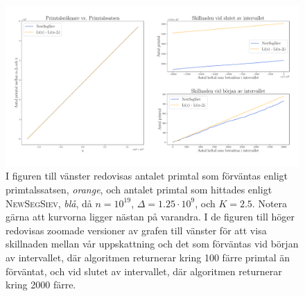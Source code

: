 \begin{figure}[H]
    \centering
    \includegraphics[width = \textwidth]{coen/Images/Primes.pdf}
    \caption{I figuren till vänster redovisas antalet primtal som förväntas enligt primtalssatsen, \textit{orange}, och antalet primtal som hittades enligt \textsc{NewSegSiev}, \textit{blå}, då \(n = 10^{19}\), \(\Delta = 1.25\cdot10^{9}\), och \(K = 2.5\). 
    Notera gärna att kurvorna ligger nästan på varandra. 
    I de figuren till höger redovisas zoomade versioner av grafen till vänster för att visa skillnaden mellan vår uppskattning och det som förväntas vid början av intervallet, där algoritmen returnerar kring 100 färre primtal än förväntat, och vid slutet av intervallet, där algoritmen returnerar kring 2000 färre.}
    \label{fig:res.prime}
\end{figure}

